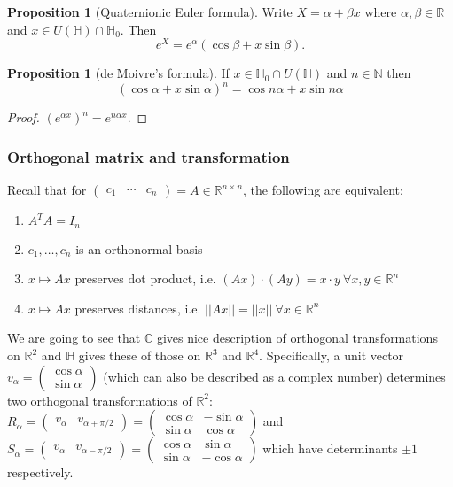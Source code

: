 \documentclass[a4paper]{article}
\newcommand{\N}{\mathbb{N}}
\newcommand{\R}{\mathbb{R}}
\newcommand{\C}{\mathbb{C}}
\newcommand{\Hq}{\mathbb{H}}
\theoremstyle{definition}
\newtheorem{prop}[defn]{Proposition}
\begin{document}
\begin{prop}[Quaternionic Euler formula]
Write $X=\alpha+\beta x$ where $\alpha,\beta\in\R$ and $x\in U(\Hq)\cap\Hq_0$. Then
\[
e^X=e^\alpha(\cos\beta+x\sin\beta).
\]
\end{prop}

\begin{prop}[de Moivre's formula]
If $x\in\Hq_0\cap U(\Hq)$ and $n\in\N$ then
\[
(\cos\alpha+x\sin\alpha)^n=\cos n\alpha+x\sin n\alpha
\]
\end{prop}
\begin{proof}
$(e^{\alpha x})^n=e^{n\alpha x}$.
\end{proof}

\subsubsection{Orthogonal matrix and transformation}
Recall that for $\begin{pmatrix}c_1&\cdots&c_n\end{pmatrix}=A\in\R^{n\times n}$, the following are equivalent:
\begin{enumerate}
\item $A^TA=I_n$
\item $c_1,\ldots,c_n$ is an orthonormal basis
\item $x\mapsto Ax$ preserves dot product, i.e. $(Ax)\cdot(Ay)=x\cdot y \ \forall x,y\in\R^n$
\item $x\mapsto Ax$ preserves distances, i.e. $||Ax||=||x|| \ \forall x\in\R^n$
\end{enumerate}

We are going to see that $\C$ gives nice description of orthogonal transformations on $\R^2$ and $\Hq$ gives these of those on $\R^3$ and $\R^4$. Specifically, a unit vector $v_\alpha=\begin{pmatrix}\cos\alpha\\ \sin\alpha\end{pmatrix}$ (which can also be described as a complex number) determines two orthogonal transformations of $\R^2$: $R_{\alpha}=\begin{pmatrix}v_{\alpha} & v_{\alpha+\pi/2}\end{pmatrix}=\begin{pmatrix}\cos\alpha&-\sin\alpha\\ \sin\alpha&\cos\alpha\end{pmatrix}$ and $S_{\alpha}=\begin{pmatrix}v_{\alpha} & v_{\alpha-\pi/2}\end{pmatrix}=\begin{pmatrix}\cos\alpha&\sin\alpha\\\sin\alpha&-\cos\alpha\end{pmatrix}$ which have determinants $\pm 1$ respectively.
\end{document}
